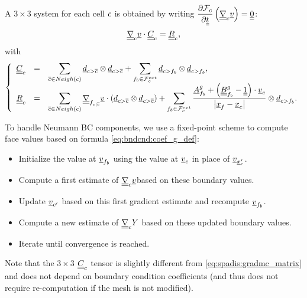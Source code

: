 A $3\times 3$ system for each cell $c$
is obtained by writing  $\dfrac{\partial \mathcal{F}_c}{\partial \underline{\underline{t}} }
\left( \underline{\underline{{\nabla}}}_c \underline{v} \right)= \underline{\underline{0}}$:
%
\begin{equation}\label{eq:spadis:gradmv_matrix}
\underline{\underline{{\nabla}}}_c \underline{v} \cdot \underline{\underline{C}}_{c} = \underline{\underline{R}}_{c} ,
\end{equation}
with
%
\begin{equation}
\left\{
\begin{array}{r c l}
\underline{\underline{C}}_{c} &=&
\displaystyle
 \sum\limits_{{\overline{c}} \in Neigh\left(c\right) }
 \underline{d}_{{c > {\overline{c}}}} \otimes \underline{d}_{{c > {\overline{c}}}}
+
\sum\limits_{{{f}_{b}} \in \mathcal{F}^{ext}_{c}}
\underline{d}_{c>{{f}_{b}}} \otimes  \underline{d}_{c>{{f}_{b}}} ,
\\
\underline{\underline{R}}_{c} &=&
\displaystyle
\sum\limits_{ {\overline{c}} \in Neigh\left(c\right) }
 \underline{\underline{{\nabla}}}_{{{f}_{c|{\overline{c}}}}} \underline{v}   \cdot \left( \underline{d}_{{c > {\overline{c}}}} \otimes \underline{d}_{{c > {\overline{c}}}} \right)
+
\sum\limits_{ {{f}_{b}} \in \mathcal{F}^{ext}_{c}}
\dfrac{
\underline{A}^g_{{{f}_{b}}} +\left(\underline{\underline{B}}^g_{{{f}_{b}}} -\underline{\underline{1}} \right) \cdot \underline{v}_{c}
}{
\left| \underline{x}_{{f}} - {\underline{x}_{c}} \right|
}
\otimes
\underline{d}_{c>{{f}_{b}}} .
\end{array}\right.
\end{equation}
%

To handle Neumann BC components, we use a fixed-point scheme to compute face values
based on formula \eqref{eq:bndcnd:coef_g_def}:
\begin{itemize}
\item Initialize the value at $\underline{v}_{{{f}_{b}}}$ using the value
      at $\underline{v}_{c}$ in place of $\underline{v}_{\underline{x}_{c}^\prime}$.
\item Compute a first estimate of $\underline{\underline{{\nabla}}}_{c} \underline{v}$based on
      these boundary values.
\item Update $\underline{v}_{c^\prime}$ based on this first gradient estimate
      and recompute $\underline{v}_{{{f}_{b}}}$.
\item Compute a new estimate of $\underline{\underline{{\nabla}}}_{c} Y $ based on
      these updated boundary values.
\item Iterate until convergence is reached.
\end{itemize}

\begin{remark}
Note that the $3\times3$ $\underline{\underline{C}}_{c}$ tensor is  slightly different from \eqref{eq:spadis:gradmc_matrix} and does not depend
 on boundary condition coefficients (and thus does not require re-computation if the mesh is not modified).
\end{remark}

